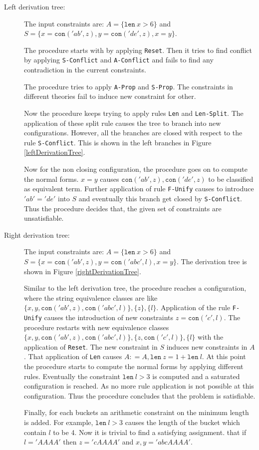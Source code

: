 \begin{description}
	\item[Left derivation tree:] The input constraints are: $A = \{ \texttt{len}\ x > 6\}$ and $S= \{ x = \texttt{con}('ab', z), y = \texttt{con}('de', z), x = y\}$.
		
	The procedure starts with by applying \texttt{Reset}. Then it tries to find conflict by applying \texttt{S-Conflict} and \texttt{A-Conflict} and fails to find any contradiction in the current constraints. 
	
	The procedure tries to apply \texttt{A-Prop} and \texttt{S-Prop}. The constraints in different theories fail to induce new constraint for other. 
	
	Now the procedure keeps trying to apply rules \texttt{Len} and \texttt{Len-Split}. The application of these split rule causes the tree to branch into new configurations. However, all the branches are closed with respect to the rule \texttt{S-Conflict}. This is shown in the left branches in Figure \ref{leftDerivationTree}.
	
	Now for the non closing configuration, the procedure goes on to compute the normal forms. $x = y$ causes  $\texttt{con} ('ab', z) ,\texttt{con} ('de', z)$ to be classified as equivalent term. Further application of rule  \texttt{F-Unify} causes to introduce $'ab' = 'de'$ into $S$ and eventually this branch get closed by \texttt{S-Conflict}. Thus the procedure decides that, the given set of constraints are unsatisfiable.
	
	
	\item[Right derivation tree:] The input constraints are: $A = \{ \texttt{len}\ x > 6\}$ and $S= \{ x = \texttt{con}('ab', z), y = \texttt{con}('abc', l), x = y\}$. The derivation tree is shown in Figure \ref{rightDerivationTree}.
		
	Similar to the left derivation tree, the procedure reaches a configuration, where the string equivalence classes are like  $\{ x,y, \texttt{con}('ab', z), \texttt{con}('abc', l)\}, \{ z\}, \{ l\}$. Application of the rule \texttt{F-Unify} causes the introduction of new constraints $ z = \texttt{con}('c', l)$. The procedure restarts with new equivalence classes  $\{ x,y, \texttt{con}('ab', z), \texttt{con}('abc', l)\}, \{ z,  \texttt{con}('c', l)\}, \{ l\}$ with the application of \texttt{Reset}. The new constraint in $S$ induces new constraints in $A$. That application of \texttt{Len} causes $A: =A , \texttt{len} \ z = 1 + \texttt{len} \ l$. At this point the procedure starts to compute the normal forms by applying different rules. Eventually the constraint $\texttt{len}\ l > 3$ is computed and a saturated configuration is reached. As no more rule application is not possible at this configuration. Thus the procedure concludes that the problem is satisfiable. 
	
	Finally, for each buckets an arithmetic constraint on the minimum length is added. For example, $\texttt{len}\ l > 3$ causes the length of the bucket which contain $l$ to be 4. Now it is trivial to find a satisfying assignment. that if $ l = 'AAAA'$ then $ z = 'cAAAA'$ and $x, y = 'abcAAAA'$.
	
\end{description}